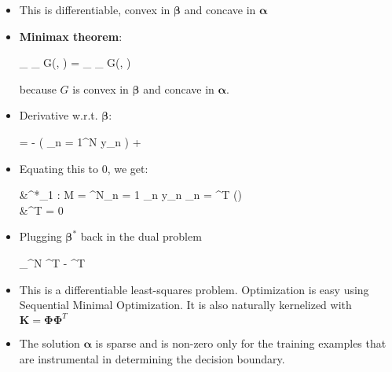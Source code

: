 \documentclass[10pt,a4paper,landscape]{article}
\makeatletter
\def\*#1{\mathbf{#1}}
\newenvironment{myalign*}{%
  \setlength{\abovedisplayskip}{8pt}%
  \setlength{\belowdisplayskip}{8pt}%
  \start@align\@ne\st@rredtrue\m@ne
}%
{\endalign}
\makeatother
\begin{document}
\begin{multicols*}{2}
\begin{itemize}
\begin{itemize}
\begin{myalign*}
		\end{myalign*}
		\item This is differentiable, convex in $\bm \beta$ and concave in $\bm \alpha$
		\item \textbf{Minimax theorem}: 
		\begin{myalign*}
		    \min_{\bm \beta} \max_{\bm \alpha} G(\bm \beta, \bm \alpha) = \max_{\bm \alpha} \min_{\bm \beta} G(\bm \beta, \bm \alpha)
		\end{myalign*}
		because $G$ is convex in $\bm \beta$ and concave in $\bm \alpha$.
		\item Derivative w.r.t. $\bm \beta$:
		\begin{myalign*}
		     = - 
		    \left(
		    	\sum_{n = 1}^N \alpha y_n \tilde{\phi_n}
		    \right)
		    + 
		\end{myalign*}
		\item Equating this to 0, we get:
			\begin{myalign*}
			    &\bm \beta^*_{1 : M} = \sum^N_{n = 1} \alpha_n y_n \phi_n = \bm \Phi^T (\*y) \bm \alpha\\
			    &\bm \alpha^T \*y = 0
			\end{myalign*}
		\item Plugging $\bm \beta^*$ back in the dual problem
		\begin{myalign*}
		    \max_{\bm \alpha \in [0, C]^N} \bm \alpha^T \*1 -  \bm \alpha^T \*Y \bm \Phi \bm \Phi \* Y \bm \alpha
		\end{myalign*}
		\item This is a differentiable least-squares problem. Optimization is easy using Sequential Minimal Optimization. It is also naturally kernelized with $\*K = \bm \Phi \bm \Phi^T$
		\item The solution $\bm \alpha$ is sparse and is non-zero only for the training examples that are instrumental in determining the decision boundary.
	\end{itemize}
\end{itemize}



\end{multicols*}
\end{document}
